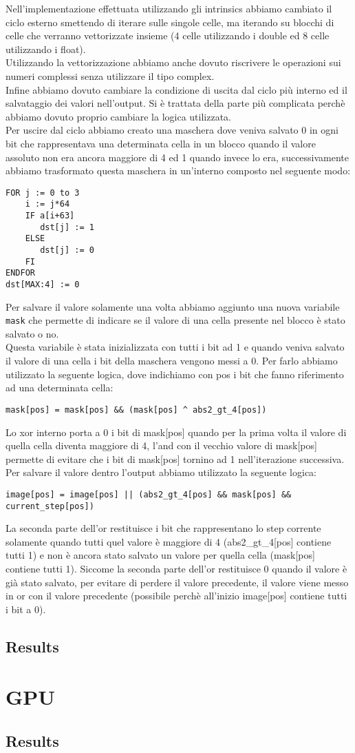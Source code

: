 \documentclass{article}
\begin{document}
Nell'implementazione effettuata utilizzando gli intrinsics abbiamo cambiato il ciclo esterno smettendo di iterare sulle singole celle, ma iterando su blocchi di celle che verranno vettorizzate insieme (4 celle utilizzando i double ed 8 celle utilizzando i float). \\
Utilizzando la vettorizzazione abbiamo anche dovuto riscrivere le operazioni sui numeri complessi senza utilizzare il tipo complex. \\
Infine abbiamo dovuto cambiare la condizione di uscita dal ciclo più interno ed il salvataggio dei valori nell'output. Si è trattata della parte più complicata perchè abbiamo dovuto proprio cambiare la logica utilizzata. \\
Per uscire dal ciclo abbiamo creato una maschera dove veniva salvato 0 in ogni bit che rappresentava una determinata cella in un blocco quando il valore assoluto non era ancora maggiore di 4 ed 1 quando invece lo era, successivamente abbiamo trasformato questa maschera in un'interno composto nel seguente modo:
\begin{verbatim}
FOR j := 0 to 3
    i := j*64
    IF a[i+63]
	   dst[j] := 1
    ELSE
	   dst[j] := 0
    FI
ENDFOR
dst[MAX:4] := 0
\end{verbatim}
Per salvare il valore solamente una volta abbiamo aggiunto una nuova variabile \texttt{mask} che permette di indicare se il valore di una cella presente nel blocco è stato salvato o no. \\
Questa variabile è stata inizializzata con tutti i bit ad 1 e quando veniva salvato il valore di una cella i bit della maschera vengono messi a 0. Per farlo abbiamo utilizzato la seguente logica, dove indichiamo con pos i bit che fanno riferimento ad una determinata cella:
\begin{verbatim}
mask[pos] = mask[pos] && (mask[pos] ^ abs2_gt_4[pos]) 
\end{verbatim}
Lo xor interno porta a 0 i bit di mask[pos] quando per la prima volta il valore di quella cella diventa maggiore di 4, l'and con il vecchio valore di mask[pos] permette di evitare che i bit di mask[pos] tornino ad 1 nell'iterazione successiva. \\
Per salvare il valore dentro l'output abbiamo utilizzato la seguente logica:
\begin{verbatim}
image[pos] = image[pos] || (abs2_gt_4[pos] && mask[pos] && current_step[pos])
\end{verbatim}
La seconda parte dell'or restituisce i bit che rappresentano lo step corrente solamente quando tutti quel valore è maggiore di 4 (abs2\_gt\_4[pos] contiene tutti 1) e non è ancora stato salvato un valore per quella cella (mask[pos] contiene tutti 1). Siccome la seconda parte dell'or restituisce 0 quando il valore è già stato salvato, per evitare di perdere il valore precedente, il valore viene messo in or con il valore precedente (possibile perchè all'inizio image[pos] contiene tutti i bit a 0).
\subsection{Results}

\section{GPU}

\subsection{Results}
\end{document}
